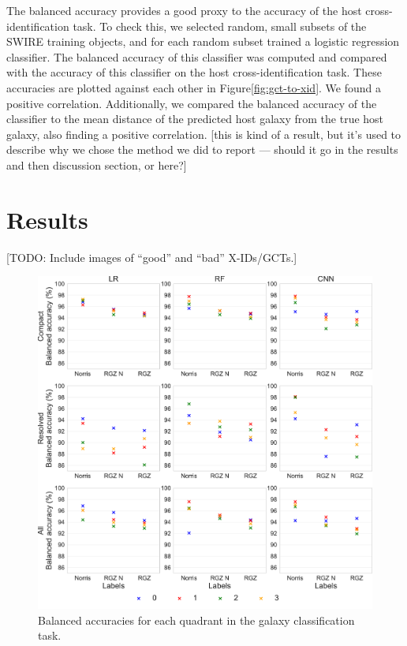 \documentclass[fleqn,usenatbib,usedcolumn]{mnras}
\begin{document}
    The balanced accuracy provides a good proxy to the accuracy of the host
    cross-identification task. To check this, we selected random, small
    subsets of the SWIRE training objects, and for each random subset
    trained a logistic regression classifier. The balanced accuracy of this
    classifier was computed and compared with the accuracy of this
    classifier on the host cross-identification task. These accuracies are
    plotted against each other in {Figure}\ref{fig:gct-to-xid}. We
    found a positive correlation. Additionally, we compared the balanced
    accuracy of the classifier to the mean distance of the predicted host
    galaxy from the true host galaxy, also finding a positive correlation.
    {[}this is kind of a result, but it's used to describe why we chose the
    method we did to report --- should it go in the results and then
    discussion section, or here?{]}

\section{Results}\label{results}

  {[}TODO: Include images of ``good'' and ``bad'' X-IDs/GCTs.{]}

  \begin{figure}[htbp]
  \centering
  \includegraphics[width=\columnwidth]{atlas-ml-ba-grid.pdf}
  \caption{Balanced accuracies for each quadrant in the galaxy
  classification task.\label{fig:ba}}
  \end{figure}
\end{document}
